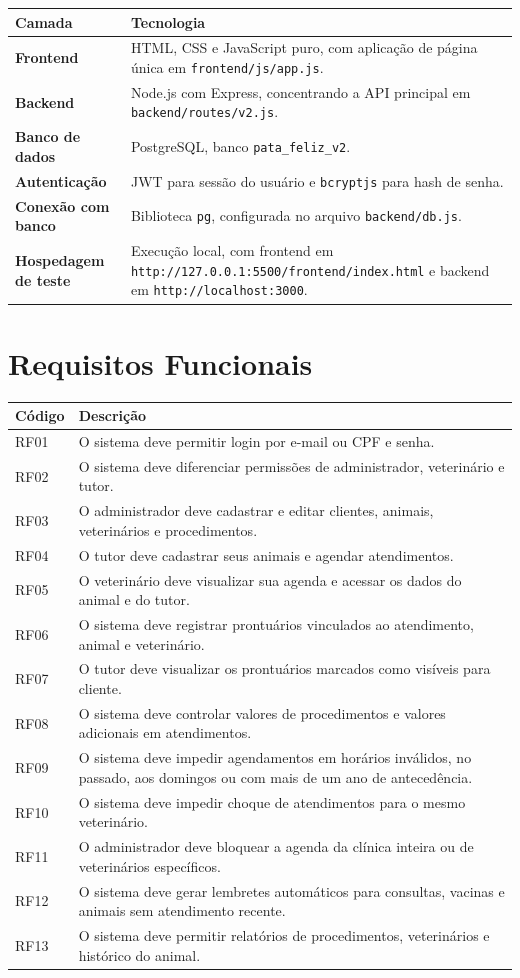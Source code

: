\documentclass[12pt,a4paper]{article}
\begin{document}
\begin{longtable}{>{\bfseries}p{4cm}p{10cm}}
\toprule
Camada & Tecnologia \\
\midrule
Frontend & HTML, CSS e JavaScript puro, com aplicação de página única em \texttt{frontend/js/app.js}. \\
Backend & Node.js com Express, concentrando a API principal em \texttt{backend/routes/v2.js}. \\
Banco de dados & PostgreSQL, banco \texttt{pata\_feliz\_v2}. \\
Autenticação & JWT para sessão do usuário e \texttt{bcryptjs} para hash de senha. \\
Conexão com banco & Biblioteca \texttt{pg}, configurada no arquivo \texttt{backend/db.js}. \\
Hospedagem de teste & Execução local, com frontend em \texttt{http://127.0.0.1:5500/frontend/index.html} e backend em \texttt{http://localhost:3000}. \\
\bottomrule
\end{longtable}

\section{Requisitos Funcionais}

\begin{longtable}{p{2.5cm}p{11.5cm}}
\toprule
\textbf{Código} & \textbf{Descrição} \\
\midrule
RF01 & O sistema deve permitir login por e-mail ou CPF e senha. \\
RF02 & O sistema deve diferenciar permissões de administrador, veterinário e tutor. \\
RF03 & O administrador deve cadastrar e editar clientes, animais, veterinários e procedimentos. \\
RF04 & O tutor deve cadastrar seus animais e agendar atendimentos. \\
RF05 & O veterinário deve visualizar sua agenda e acessar os dados do animal e do tutor. \\
RF06 & O sistema deve registrar prontuários vinculados ao atendimento, animal e veterinário. \\
RF07 & O tutor deve visualizar os prontuários marcados como visíveis para cliente. \\
RF08 & O sistema deve controlar valores de procedimentos e valores adicionais em atendimentos. \\
RF09 & O sistema deve impedir agendamentos em horários inválidos, no passado, aos domingos ou com mais de um ano de antecedência. \\
RF10 & O sistema deve impedir choque de atendimentos para o mesmo veterinário. \\
RF11 & O administrador deve bloquear a agenda da clínica inteira ou de veterinários específicos. \\
RF12 & O sistema deve gerar lembretes automáticos para consultas, vacinas e animais sem atendimento recente. \\
RF13 & O sistema deve permitir relatórios de procedimentos, veterinários e histórico do animal. \\
\bottomrule
\end{longtable}
\end{document}
